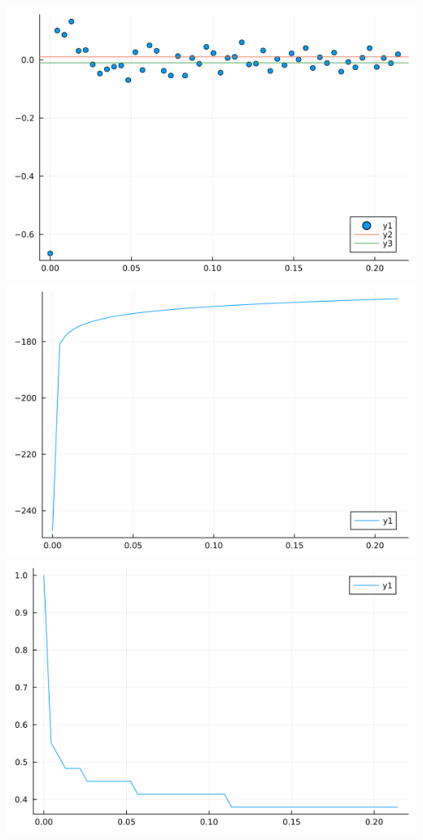 \documentclass{article}
\begin{document}
\begin{center}
    \includegraphics[scale = 0.6]{resid.png}
    \includegraphics[scale = 0.6]{value.png}
    \includegraphics[scale = 0.6]{labour.png}

\end{center}
\end{document}
